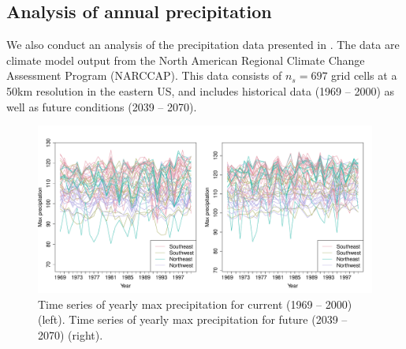\documentclass[11pt]{article}
\begin{document}

\subsection{Analysis of annual precipitation}\label{ebs:precip}
We also conduct an analysis of the precipitation data presented in \citep{Reich2012}.
The data are climate model output from the North American Regional Climate Change Assessment Program (NARCCAP).
This data consists of $n_s = 697$ grid cells at a 50km resolution in the eastern US, and includes historical data (1969 -- 2000) as well as future conditions (2039 -- 2070).

\begin{figure}[htbp]  %
  \centering
  \includegraphics[width=\linewidth]{plots/precip-ts}
  \caption{Time series of yearly max precipitation for current (1969 -- 2000) (left). Time series of yearly max precipitation for future (2039 -- 2070) (right).}
  \label{ebf:tsprecip}
\end{figure}
\end{document}
